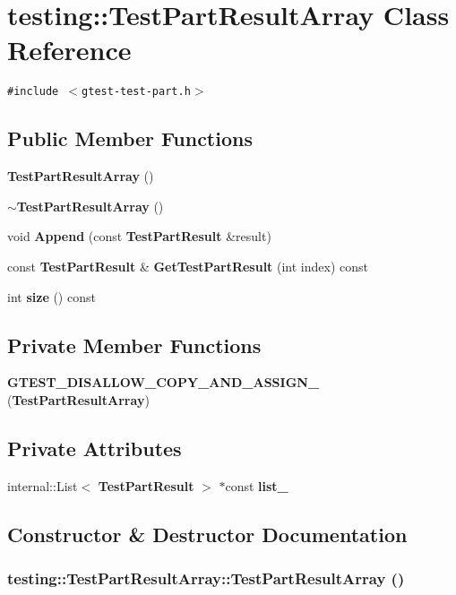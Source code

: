 \section{testing::TestPartResultArray Class Reference}
\label{classtesting_1_1TestPartResultArray}
{\tt \#include $<$gtest-test-part.h$>$}

\subsection*{Public Member Functions}
\begin{CompactItemize}
\item 
{\bf TestPartResultArray} ()
\item 
{\bf $\sim$TestPartResultArray} ()
\item 
void {\bf Append} (const {\bf TestPartResult} \&result)
\item 
const {\bf TestPartResult} \& {\bf GetTestPartResult} (int index) const
\item 
int {\bf size} () const
\end{CompactItemize}
\subsection*{Private Member Functions}
\begin{CompactItemize}
\item 
{\bf GTEST\_\-DISALLOW\_\-COPY\_\-AND\_\-ASSIGN\_\-} ({\bf TestPartResultArray})
\end{CompactItemize}
\subsection*{Private Attributes}
\begin{CompactItemize}
\item 
internal::List$<$ {\bf TestPartResult} $>$ $\ast$const {\bf list\_\-}
\end{CompactItemize}


\subsection{Constructor \& Destructor Documentation}
\subsubsection{\setlength{\rightskip}{0pt plus 5cm}testing::TestPartResultArray::TestPartResultArray ()}\label{classtesting_1_1TestPartResultArray_c2936ab40bd56cbfd219f3ac057b93e6}


